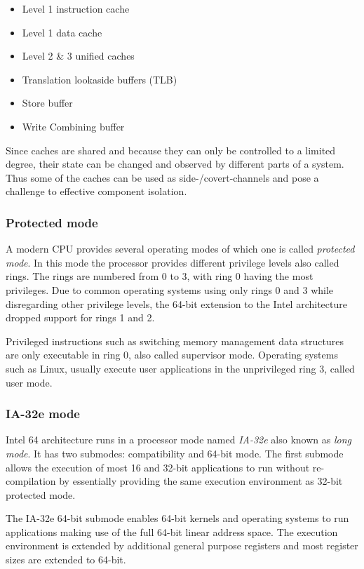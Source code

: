 \begin{itemize}
	\item Level 1 instruction cache
	\item Level 1 data cache
	\item Level 2 \& 3 unified caches
	\item Translation lookaside buffers (TLB)
	\item Store buffer
	\item Write Combining buffer
\end{itemize}

Since caches are shared and because they can only be controlled to a limited
degree, their state can be changed and observed by different parts of a system.
Thus some of the caches can be used as side-/covert-channels and pose a
challenge to effective component isolation.

\subsubsection{Protected mode}
A modern CPU provides several operating modes of which one is called
\emph{protected mode}. In this mode the processor provides different privilege
levels also called rings. The rings are numbered from 0 to 3, with ring 0 having
the most privileges. Due to common operating systems using only rings 0 and 3
while disregarding other privilege levels, the 64-bit extension to the Intel
architecture dropped support for rings 1 and 2.

Privileged instructions such as switching memory management data structures are
only executable in ring 0, also called supervisor mode. Operating systems such
as Linux, usually execute user applications in the unprivileged ring 3, called
user mode.

\subsubsection{IA-32e mode}
Intel 64 architecture runs in a processor mode named \emph{IA-32e} also known as
\emph{long mode}. It has two submodes: compatibility and 64-bit mode. The first
submode allows the execution of most 16 and 32-bit applications to run without
re-compilation by essentially providing the same execution environment as 32-bit
protected mode.

The IA-32e 64-bit submode enables 64-bit kernels and operating systems to run
applications making use of the full 64-bit linear address space. The execution
environment is extended by additional general purpose registers and most
register sizes are extended to 64-bit.

